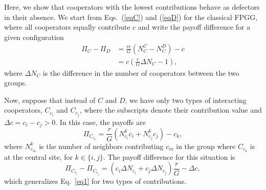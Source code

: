 \documentclass[twocolumn,aps,amsmath,pre,floatfix,superscriptaddress]{revtex4-2}
\begin{document}
\appendix


\section{}
\label{apA}


Here, we show that cooperators with the lowest contributions behave as defectors in their absence.
%
We start from Eqs.~(\ref{eqC}) and (\ref{eqD}) for the classical FPGG, where all cooperators equally contribute $c$  and write the payoff difference for a given configuration
\begin{align}
\Pi_{C} -  \Pi_{D} &=  \frac{rc}{G} \left( N_{C}^{C} - N_{C}^{D}     \right) - c \\
    &= c \left( \frac{r}{G} \Delta N_{C} - 1 \right),  \label{eq1}
\end{align}
where $\Delta N_{C}$ is the difference in the number of cooperators between the two groups. 

Now, suppose that  instead of $C$ and $D$, we have only two types of interacting cooperators, $C_{c_i}$ and  $C_{c_j}$, where the subscripts denote their contribution value and $\Delta c = c_i-c_j >0$. In this case, the payoffs are
\begin{equation}
    \Pi_{C_{c_k}} = \frac{r}{G} \left(N_{c_i}^{k} c_i + N_{c_j}^{k} c_j \right) - c_k,
\end{equation}
where $N_{c_m}^{k}$ is the number of neighbors contributing $c_m$ in the group where $C_{c_k}$ is at the central site, for $k\in \{i,j\}$. 
%
The payoff difference for this situation is 
\begin{equation}
    \Pi_{C_{c_i}} -  \Pi_{C_{c_j}} = (c_i  \Delta N_{c_i}  + c_j  \Delta N_{c_j} ) \frac{r}{G} - \Delta c,
    \label{eq.dif}
\end{equation}
%
which generalizes Eq.~\ref{eq1} for two types of contributions. 
\end{document}
